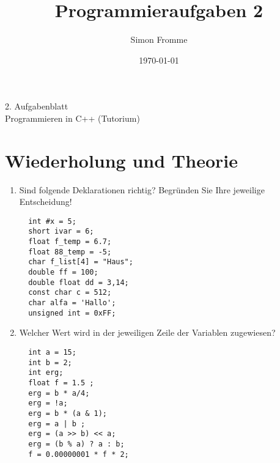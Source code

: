 \documentclass[paper=a4, fontsize=11pt, twoside]{scrartcl}
\title{Programmieraufgaben 2}
\author{Simon Fromme}
\date{\normalsize\today}
\begin{document}
\vspace*{0.75\baselineskip}
\begin{center}
  \Large 2. Aufgabenblatt \\\vspace{0.5em} \large Programmieren in C++ (Tutorium)
\end{center}

\section*{Wiederholung und Theorie}
\vspace{-1em}
\begin{multicols}{2}
\begin{enumerate}
 \item Sind folgende Deklarationen richtig? Begründen Sie Ihre jeweilige Entscheidung!
  \begin{verbatim}
  int #x = 5;
  short ivar = 6;
  float f_temp = 6.7;
  float 88_temp = -5;
  char f_list[4] = "Haus";
  double ff = 100;
  double float dd = 3,14;
  const char c = 512;
  char alfa = 'Hallo';
  unsigned int = 0xFF;
  \end{verbatim}
  \columnbreak
 \item Welcher Wert wird in der jeweiligen Zeile der Variablen zugewiesen?
  \begin{verbatim}
  int a = 15;
  int b = 2;
  int erg;
  float f = 1.5 ;
  erg = b * a/4;
  erg = !a;
  erg = b * (a & 1);
  erg = a | b ;
  erg = (a >> b) << a;
  erg = (b % a) ? a : b;
  f = 0.00000001 * f * 2;
  \end{verbatim}
\end{enumerate}
\end{multicols}
\end{document}
